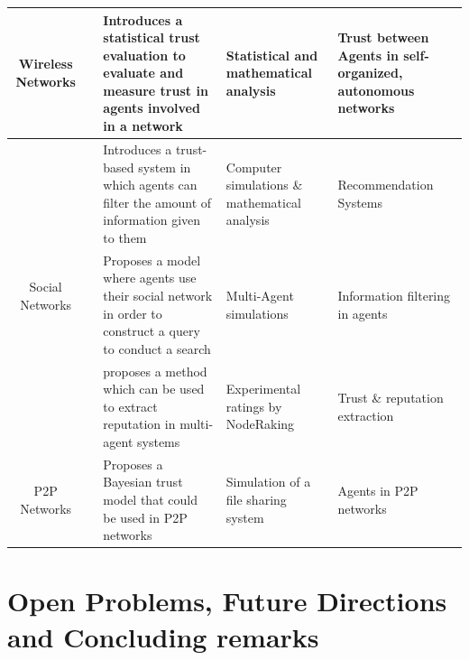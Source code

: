 \documentclass[runningheads,a4paper]{llncs}
\begin{document}
\begin{center}
\begin{longtable}{|c|c|p{4cm}|p{2cm}|p{2cm}|}
	\multirow{1}{*}{Wireless Networks}
	& \cite{jiang2006trust}
	& Introduces a statistical trust evaluation to evaluate and measure trust in agents involved in a network       
	& Statistical and mathematical analysis
	& Trust between Agents in self-organized, autonomous networks
	\\ \hline
	
	\multirow{3}{*}{Social Networks}
	& \cite{battiston2006impact}
	& Introduces a trust-based system in which agents can filter the amount of information given to them                    
	& Computer simulations \& mathematical analysis                   
	& Recommendation Systems
	\\ \cline{2-5}
	& \cite{walter2008model}
	& Proposes a model where agents use their social network in order to construct a query to conduct a search                    
	& Multi-Agent simulations                     
	& Information filtering in agents            
	\\ \cline{2-5} 
	& \cite{pujol2002extracting}
	& proposes a method which can be used to extract reputation in multi-agent systems                            
	& Experimental ratings by NodeRaking                
	& Trust \& reputation extraction              
	\\ \hline
	
	\multirow{1}{*}{P2P Networks}
	& \cite{wang2003bayesian}
	& Proposes a Bayesian trust model that could be used in P2P networks                
	& Simulation of a file sharing system       
	& Agents in P2P networks
	\\ \hline

\end{longtable}
\end{center}

\section{Open Problems, Future Directions and Concluding remarks}
%

\end{document}

